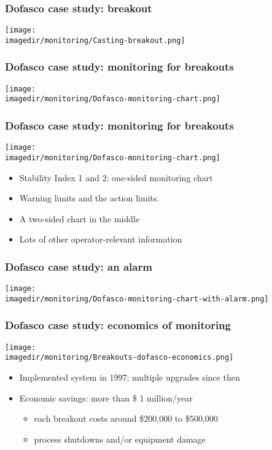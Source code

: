 \begin{frame}\frametitle{Dofasco case study: breakout}
	
	\texttt{[image: \\imagedir/monitoring/Casting-breakout.png]}
\end{frame}

\begin{frame}\frametitle{Dofasco case study: monitoring for breakouts}
	
	\texttt{[image: \\imagedir/monitoring/Dofasco-monitoring-chart.png]}
\end{frame}

\begin{frame}\frametitle{Dofasco case study: monitoring for breakouts}
	
	\texttt{[image: \\imagedir/monitoring/Dofasco-monitoring-chart.png]}
	\begin{itemize}
		\item	Stability Index 1 and 2: one-sided monitoring chart 
		\item	Warning limits and the action limits. 
		\item	A two-sided chart in the middle 
		\item	Lots of other operator-relevant information 
	\end{itemize}
\end{frame}

\begin{frame}\frametitle{Dofasco case study: an alarm}
	
	\texttt{[image: \\imagedir/monitoring/Dofasco-monitoring-chart-with-alarm.png]}
\end{frame}

\begin{frame}\frametitle{Dofasco case study: economics of monitoring}
	
	\texttt{[image: \\imagedir/monitoring/Breakouts-dofasco-economics.png]}
	\begin{itemize}
		\item	Implemented system in 1997; multiple upgrades since then 
		\item	Economic savings: more than \$ 1 million/year 
		\begin{itemize}
			\item	each breakout costs around \$200,000 to \$500,000 
			\item	process shutdowns and/or equipment damage 
		\end{itemize}
	\end{itemize}
\end{frame}

